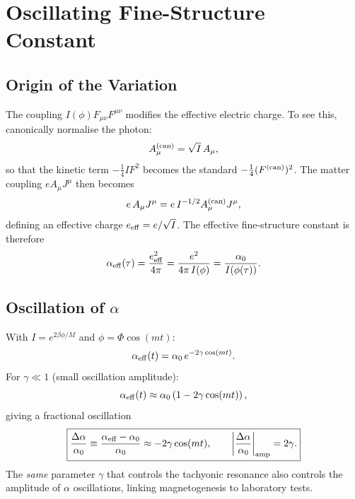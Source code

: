\documentclass[12pt,a4paper,openany]{book}
\begin{document}
\chapter{Oscillating Fine-Structure Constant}
\label{chap:fsc}

\section{Origin of the Variation}

The coupling $I(\phi)F_{\mu\nu}F^{\mu\nu}$ modifies the effective electric charge. To see this, canonically normalise the photon:
\begin{equation}
  A_\mu^{(\rm can)} = \sqrt{I}\,A_\mu,
\end{equation}
so that the kinetic term $-\frac{1}{4}I F^2$ becomes the standard $-\frac{1}{4}(F^{(\rm can)})^2$. The matter coupling $e A_\mu J^\mu$ then becomes
\begin{equation}
  e\,A_\mu J^\mu = e\,I^{-1/2}A_\mu^{(\rm can)}J^\mu,
\end{equation}
defining an effective charge $e_{\rm eff} = e/\sqrt{I}$. The effective fine-structure constant is therefore
\begin{equation}
  \alpha_{\rm eff}(\tau) = \frac{e_{\rm eff}^2}{4\pi} = \frac{e^2}{4\pi\,I(\phi)} = \frac{\alpha_0}{I(\phi(\tau))}.
\end{equation}

\section{Oscillation of $\alpha$}

With $I = e^{2\beta\phi/M}$ and $\phi = \Phi\cos(mt)$:
\begin{equation}
  \alpha_{\rm eff}(t) = \alpha_0\,e^{-2\gamma\cos(mt)}.
\end{equation}
For $\gamma \ll 1$ (small oscillation amplitude):
\begin{equation}
  \alpha_{\rm eff}(t) \approx \alpha_0\left(1 - 2\gamma\cos(mt)\right),
\end{equation}
giving a fractional oscillation
\begin{equation}
  \boxed{\frac{\Delta\alpha}{\alpha_0} \equiv \frac{\alpha_{\rm eff} - \alpha_0}{\alpha_0} \approx -2\gamma\cos(mt), \qquad \left|\frac{\Delta\alpha}{\alpha_0}\right|_{\rm amp} = 2\gamma.}
\end{equation}
The \emph{same} parameter $\gamma$ that controls the tachyonic resonance also controls the amplitude of $\alpha$ oscillations, linking magnetogenesis to laboratory tests.
\end{document}
